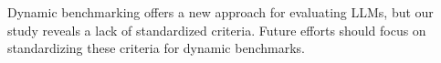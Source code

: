 


Dynamic benchmarking offers a new approach for evaluating LLMs, but our study reveals a lack of standardized criteria. Future efforts should focus on standardizing these criteria for dynamic benchmarks.






